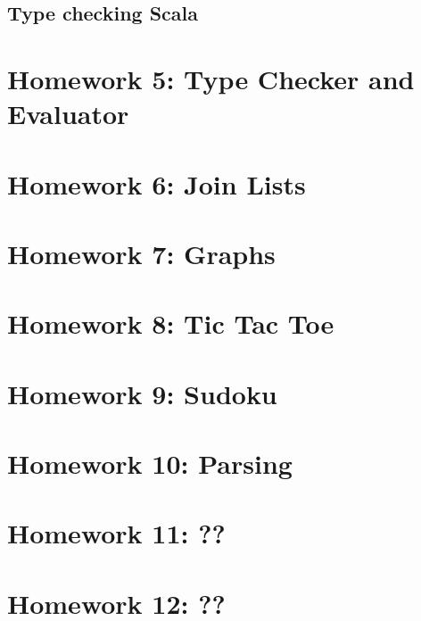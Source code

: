 \documentclass{book}
\begin{document}
\section{Type checking Scala}

\chapter{Homework 5: Type Checker and Evaluator}

\chapter{Homework 6: Join Lists}

\chapter{Homework  7: Graphs}

\chapter{Homework 8: Tic Tac Toe}

\chapter{Homework 9: Sudoku}

\chapter{Homework 10: Parsing}

\chapter{Homework 11: ??}

\chapter{Homework 12: ??}
\end{document}
